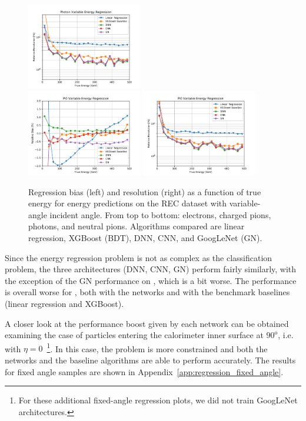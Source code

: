 \begin{figure}[htbp]
\includegraphics[width=0.45\textwidth]{Images/Calo/res_vs_E_Gamma_variable.pdf}\\
\includegraphics[width=0.45\textwidth]{Images/Calo/bias_vs_E_Pi0_variable.pdf}
\includegraphics[width=0.45\textwidth]{Images/Calo/res_vs_E_Pi0_variable.pdf}
\caption{Regression bias (left) and resolution (right) as a function
  of true energy for energy predictions on the REC dataset with
  variable-angle incident angle. From top to bottom: electrons,
  charged pions, photons, and neutral
  pions. Algorithms compared are linear regression, XGBoost (BDT), DNN, CNN, and GoogLeNet (GN).\label{fig:reg_dnn_vs_cnn_variable}}
\end{figure}

Since the energy regression problem is not as complex as the classification problem, the three architectures (DNN, CNN, GN) perform fairly similarly, with the exception of the GN performance on \chpi, which is a bit worse.
The performance is overall worse for \chpi, both with the networks and with the benchmark baselines (linear regression and XGBoost).

A closer look at the performance boost given by each network can be obtained examining the case of particles entering the calorimeter inner surface at $90^{\mathrm o}$, i.e. with $\eta=0$~\footnote{For these additional fixed-angle regression plots, we did not train GoogLeNet architectures.}. In this case, the problem is more constrained and both the networks and the baseline algorithms are able to perform accurately. The results for fixed angle samples are shown in Appendix~\ref{app:regression_fixed_angle}.


